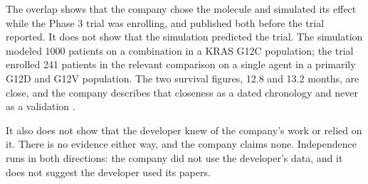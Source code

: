 The overlap shows that the company chose the molecule and simulated its effect
while the Phase 3 trial was enrolling, and published both before the trial
reported. It does not show that the simulation predicted the trial. The
simulation modeled 1000 patients on a combination in a KRAS G12C population; the
trial enrolled 241 patients in the relevant comparison on a single agent in a
primarily G12D and G12V population. The two survival figures, 12.8 and 13.2
months, are close, and the company describes that closeness as a dated chronology
and never as a validation \cite{qspmetpancre,rasolute302}.

It also does not show that the developer knew of the company's work or relied on
it. There is no evidence either way, and the company claims none. Independence
runs in both directions: the company did not use the developer's data, and it
does not suggest the developer used its papers.
